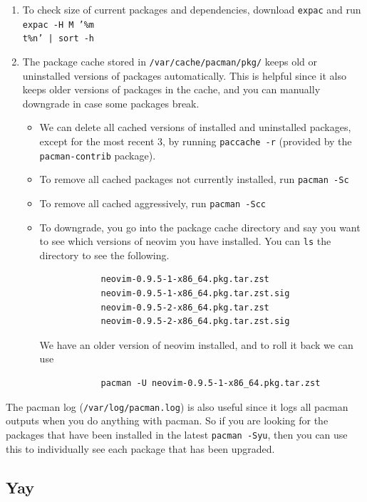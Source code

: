 \documentclass{article}
\begin{document}
\begin{enumerate}
      \item To check size of current packages and dependencies, download \texttt{expac} and run \texttt{expac -H M '\%m \\t\%n' | sort -h} 

      \item The package cache stored in \texttt{/var/cache/pacman/pkg/} keeps old or uninstalled versions of packages automatically. This is helpful since it also keeps older versions of packages in the cache, and you can manually downgrade in case some packages break.  
      \begin{itemize}
        \item We can delete all cached versions of installed and uninstalled packages, except for the most recent 3, by running \texttt{paccache -r} (provided by the \texttt{pacman-contrib} package). 
        \item To remove all cached packages not currently installed, run \texttt{pacman -Sc}
        \item To remove all cached aggressively, run \texttt{pacman -Scc}
        \item To downgrade, you go into the package cache directory and say you want to see which versions of neovim you have installed. You can \texttt{ls} the directory to see the following. 
        
          \begin{lstlisting}
            neovim-0.9.5-1-x86_64.pkg.tar.zst
            neovim-0.9.5-1-x86_64.pkg.tar.zst.sig
            neovim-0.9.5-2-x86_64.pkg.tar.zst
            neovim-0.9.5-2-x86_64.pkg.tar.zst.sig
          \end{lstlisting}

          We have an older version of neovim installed, and to roll it back we can use 
          \begin{lstlisting} 
            pacman -U neovim-0.9.5-1-x86_64.pkg.tar.zst
          \end{lstlisting}
      \end{itemize} 
    \end{enumerate}

    The pacman log (\texttt{/var/log/pacman.log}) is also useful since it logs all pacman outputs when you do anything with pacman. So if you are looking for the packages that have been installed in the latest \texttt{pacman -Syu}, then you can use this to individually see each package that has been upgraded. 

  \subsection{Yay}
\end{document}
